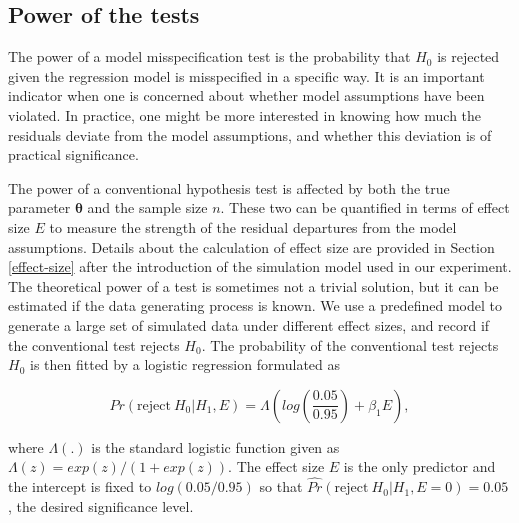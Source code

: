 \documentclass[]{interact}
\theoremstyle{plain}%
\theoremstyle{definition}
\theoremstyle{remark}
\begin{document}
\hypertarget{power-of-the-tests}{%
\subsection{Power of the tests}\label{power-of-the-tests}}

The power of a model misspecification test is the probability that
\(H_0\) is rejected given the regression model is misspecified in a
specific way. It is an important indicator when one is concerned about
whether model assumptions have been violated. In practice, one might be
more interested in knowing how much the residuals deviate from the model
assumptions, and whether this deviation is of practical significance.

The power of a conventional hypothesis test is affected by both the true
parameter \(\boldsymbol{\theta}\) and the sample size \(n\). These two
can be quantified in terms of effect size \(E\) to measure the strength
of the residual departures from the model assumptions. Details about the
calculation of effect size are provided in Section \ref{effect-size}
after the introduction of the simulation model used in our experiment.
The theoretical power of a test is sometimes not a trivial solution, but
it can be estimated if the data generating process is known. We use a
predefined model to generate a large set of simulated data under
different effect sizes, and record if the conventional test rejects
\(H_0\). The probability of the conventional test rejects \(H_0\) is
then fitted by a logistic regression formulated as

\begin{equation} \label{eq:logistic-regression-1-1}
Pr(\text{reject}~H_0|H_1,E) = \Lambda\left(log\left(\frac{0.05}{0.95}\right) + \beta_1 E\right),
\end{equation}

\noindent where \(\Lambda(.)\) is the standard logistic function given
as \(\Lambda(z) = exp(z)/(1+exp(z))\). The effect size \(E\) is the only
predictor and the intercept is fixed to \(log(0.05/0.95)\) so that
\(\hat{Pr}(\text{reject}~H_0|H_1,E = 0) = 0.05\), the desired
significance level.
\end{document}
